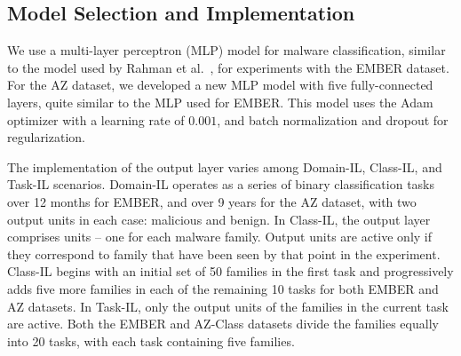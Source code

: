 






\subsection{Model Selection and Implementation}
\label{sec:modelSelectionTraining}

We use a multi-layer perceptron (MLP) model for malware classification, similar to the model used by Rahman et al.~\cite{continual-learning-malware}, for experiments with the EMBER dataset. For the AZ dataset, we developed a new MLP model with five fully-connected layers, quite similar to the MLP used for EMBER. This model uses the Adam optimizer with a learning rate of $0.001$, and batch normalization and dropout for regularization. 


The implementation of the output layer varies among Domain-IL, Class-IL, and Task-IL scenarios. Domain-IL operates as a series of binary classification tasks over 12 months for EMBER, and over 9 years for the AZ dataset, with two output units in each case: malicious and benign. In Class-IL, the output layer comprises units -- one for each malware family. Output units are active only if they correspond to family that have been seen by that point in the experiment. Class-IL begins with an initial set of 50 families in the first task and progressively adds five more families in each of the remaining 10 tasks for both EMBER and AZ datasets. In Task-IL, only the output units of the families in the current task are active. Both the EMBER and AZ-Class datasets divide the families equally into 20 tasks, with each task containing five families. 

